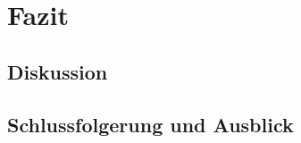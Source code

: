 \ifIncludeMiscellaneous
\part{Fazit}
\label{part:Fazit}
\fi

\chapter{Diskussion}
\label{chap:Diskussion}

\ifIncludeAllChapters

\fi

\ifIncludeAllChapters

\fi

\chapter{Schlussfolgerung und Ausblick}
\label{chap:Schlussfolgerung-und-Ausblick}

\ifIncludeAllChapters

\fi


